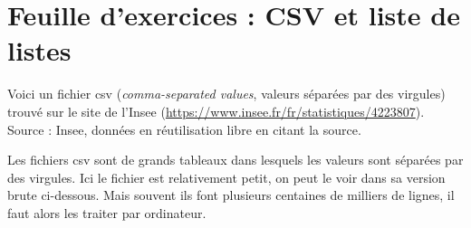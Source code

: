 \setcounter{Exercise}{0}

\chapter*{Feuille d'exercices : CSV et liste de listes}

Voici un fichier csv (\textit{comma-separated values}, valeurs séparées par des virgules) trouvé sur le site de l'Insee (\url{https://www.insee.fr/fr/statistiques/4223807}). Source : Insee, données en réutilisation libre en citant la source.

Les fichiers csv sont de grands tableaux dans lesquels les valeurs sont séparées par des virgules. Ici le fichier est relativement petit, on peut le voir dans sa version brute ci-dessous. Mais souvent ils font plusieurs centaines de milliers de lignes, il faut alors les traiter par ordinateur.


